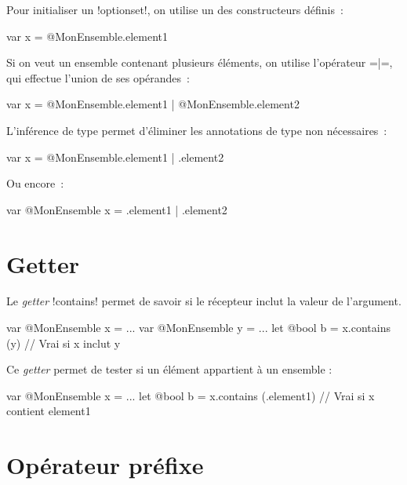 Pour initialiser un \ggsq!optionset!, on utilise un des constructeurs définis~:
\begin{galgas4}
var x = @MonEnsemble.element1
\end{galgas4}

Si on veut un ensemble contenant plusieurs éléments, on utilise l'opérateur \ggsq=|=, qui effectue l'union de ses opérandes~:
\begin{galgas4}
var x = @MonEnsemble.element1 | @MonEnsemble.element2
\end{galgas4}

L'inférence de type permet d'éliminer les annotations de type non nécessaires~:
\begin{galgas4}
var x = @MonEnsemble.element1 | .element2
\end{galgas4}

Ou encore~:
\begin{galgas4}
var @MonEnsemble x = .element1 | .element2
\end{galgas4}





















\section{Getter}


Le \emph{getter} \ggsq!contains! permet de savoir si le récepteur inclut la valeur de l'argument.


\begin{galgas4}
var @MonEnsemble x = ...
var @MonEnsemble y = ...
let @bool b = x.contains (y) // Vrai si x inclut y
\end{galgas4}

Ce \emph{getter} permet de tester si un élément appartient à un ensemble :
\begin{galgas4}
var @MonEnsemble x = ...
let @bool b = x.contains (.element1) // Vrai si x contient element1
\end{galgas4}






\section{Opérateur préfixe}

